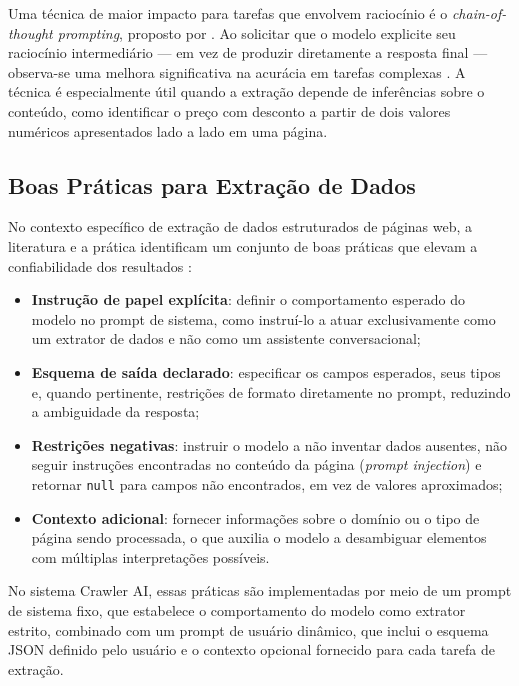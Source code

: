 \documentclass[tcc,capa]{texifsul}
\begin{document}
Uma técnica de maior impacto para tarefas que envolvem raciocínio é o \textit{chain-of-thought prompting}, proposto por \citeauthor{Wei2022}. Ao solicitar que o modelo explicite seu raciocínio intermediário — em vez de produzir diretamente a resposta final — observa-se uma melhora significativa na acurácia em tarefas complexas \cite{Wei2022}. A técnica é especialmente útil quando a extração depende de inferências sobre o conteúdo, como identificar o preço com desconto a partir de dois valores numéricos apresentados lado a lado em uma página.

\subsection*{Boas Práticas para Extração de Dados}

No contexto específico de extração de dados estruturados de páginas web, a literatura e a prática identificam um conjunto de boas práticas que elevam a confiabilidade dos resultados \cite{Zhao2023}:

\begin{itemize}
    \item \textbf{Instrução de papel explícita}: definir o comportamento esperado do modelo no prompt de sistema, como instruí-lo a atuar exclusivamente como um extrator de dados e não como um assistente conversacional;
    \item \textbf{Esquema de saída declarado}: especificar os campos esperados, seus tipos e, quando pertinente, restrições de formato diretamente no prompt, reduzindo a ambiguidade da resposta;
    \item \textbf{Restrições negativas}: instruir o modelo a não inventar dados ausentes, não seguir instruções encontradas no conteúdo da página (\textit{prompt injection}) e retornar \texttt{null} para campos não encontrados, em vez de valores aproximados;
    \item \textbf{Contexto adicional}: fornecer informações sobre o domínio ou o tipo de página sendo processada, o que auxilia o modelo a desambiguar elementos com múltiplas interpretações possíveis.
\end{itemize}

No sistema Crawler AI, essas práticas são implementadas por meio de um prompt de sistema fixo, que estabelece o comportamento do modelo como extrator estrito, combinado com um prompt de usuário dinâmico, que inclui o esquema JSON definido pelo usuário e o contexto opcional fornecido para cada tarefa de extração.
\end{document}
